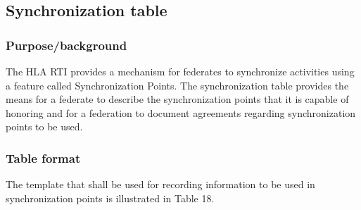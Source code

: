 \subsection{Synchronization table}

\subsubsection{Purpose/background}
The HLA RTI provides a mechanism for federates to synchronize activities using a feature called Synchronization Points. The synchronization table provides the means for a federate to describe the synchronization points that it is capable of honoring and for a federation to document agreements regarding synchronization points to be used.

\vspace{-13.8pt}

\subsubsection{Table format}
The template that shall be used for recording information to be used in synchronization points is illustrated in Table 18.

\vspace{-7pt}
\begingroup
\fontsize{9}{10.9}\selectfont
\setlength{\tabcolsep}{4pt}
\renewcommand{\arraystretch}{1.25}
\noindent{}
\endgroup\vspace{6.5pt}

